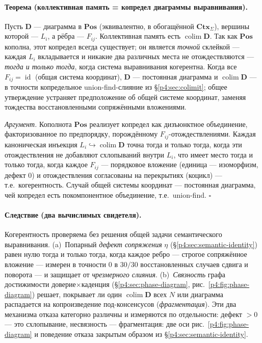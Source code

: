 \documentclass{article}
\begin{document}
\paragraph{Теорема (коллективная память = копредел диаграммы выравнивания).}
Пусть $\mathbf{D}$ --- диаграмма в $\mathbf{Pos}$ (эквивалентно, в обогащённой
$\mathbf{Ctx}_\Sigma$), вершины которой --- $L_i$, а рёбра --- $F_{ij}$.
Коллективная память есть $\operatorname{colim}\mathbf{D}$. Так как
$\mathbf{Pos}$ кополна, этот копредел всегда существует; он является
\emph{точной} склейкой --- каждая $L_i$ вкладывается и никакие два различных
места не отождествляются --- \emph{тогда и только тогда}, когда система
выравнивания когерентна. Когда все $F_{ij}=\operatorname{id}$ (общая система
координат), $\mathbf{D}$ --- постоянная диаграмма и
$\operatorname{colim}\mathbf{D}$ --- в точности копредельное union-find-слияние
из \S\ref{p4:sec:colimit}; общее утверждение устраняет предположение об общей
системе координат, заменяя тождества восстановленными сопряжёнными вложениями.

\emph{Аргумент.} Кополнота $\mathbf{Pos}$ реализует копредел как дизъюнктное
объединение, факторизованное по предпорядку, порождённому
$F_{ij}$-отождествлениями. Каждая каноническая инъекция
$L_i\hookrightarrow\operatorname{colim}\mathbf{D}$ точна тогда и только тогда,
когда эти отождествления не добавляют схлопываний внутри $L_i$, что имеет
место тогда и только тогда, когда каждое $F_{ij}$ --- порядковое вложение
(единица --- изоморфизм, дефект $0$) и отождествления согласованы на
перекрытиях (коцикл) --- т.е.\ когерентность. Случай общей системы координат
--- постоянная диаграмма, чей копредел есть покомпонентное объединение, т.е.\
union-find. \hfill$\square$

\paragraph{Следствие (два вычислимых свидетеля).} Когерентность проверяема без
решения общей задачи семантического выравнивания. (a)~Попарный \emph{дефект
сопряжения} $\eta$ (\S\ref{p4:sec:semantic-identity}) равен нулю тогда и только
тогда, когда каждое ребро --- строгое сопряжённое вложение --- измерен в
точности $0$ в $30/30$ восстановленных случаев сдвига и поворота --- и
защищает от \emph{чрезмерного слияния}. (b)~\emph{Связность} графа
достижимости доверие$\times$каденция (\S\ref{p4:sec:phase-diagram},
рис.~\ref{p4:fig:phase-diagram}) решает, покрывает ли один
$\operatorname{colim}\mathbf{D}$ всех $N$ или диаграмма распадается на
копроизведение под-консенсусов (\emph{фрагментация}). Эти два механизма отказа
категорно различны и измеряются по отдельности: дефект $>0$ --- это
схлопывание, несвязность --- фрагментация: две оси
рис.~\ref{p4:fig:phase-diagram} и поведение отказа закрытым образом из
\S\ref{p4:sec:semantic-identity}.
\end{document}
